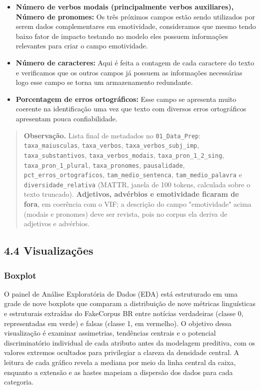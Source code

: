 \documentclass[
  brazilian,
  11pt,
]{article}
\begin{document}
\begin{itemize}
\item
  \textbf{Número de verbos modais (principalmente verbos auxiliares), Número de pronomes:} Os três próximos campos estão sendo utilizados por serem dados complementares em emotividade, consideramos que mesmo tendo baixo fator de impacto testando no modelo eles possuem informações relevantes para criar o campo emotividade.
\item
  \textbf{Número de caracteres:} Aqui é feita a contagem de cada caractere do texto e verificamos que os outros campos já possuem as informações necessárias logo esse campo se torna um armazenamento redundante.
\item
  \textbf{Porcentagem de erros ortográficos:} Esse campo se apresenta muito coerente na identificação uma vez que texto com diversos erros ortográficos apresentam pouca confiabilidade.
\end{itemize}

\begin{quote}
\textbf{Observação.} Lista final de metadados no \texttt{01\_Data\_Prep}: \texttt{taxa\_maiusculas}, \texttt{taxa\_verbos}, \texttt{taxa\_verbos\_subj\_imp}, \texttt{taxa\_substantivos}, \texttt{taxa\_verbos\_modais}, \texttt{taxa\_pron\_1\_2\_sing}, \texttt{taxa\_pron\_1\_plural}, \texttt{taxa\_pronomes}, \texttt{pausalidade}, \texttt{pct\_erros\_ortograficos}, \texttt{tam\_medio\_sentenca}, \texttt{tam\_medio\_palavra} e \texttt{diversidade\_relativa} (MATTR, janela de 100 tokens, calculada sobre o texto truncado). \textbf{Adjetivos, advérbios e emotividade ficaram de fora}, em coerência com o VIF; a descrição do campo "emotividade" acima (modais e pronomes) deve ser revista, pois no corpus ela deriva de adjetivos e advérbios.
\end{quote}

\subsection{4.4 Visualizações}\label{visualizauxe7uxf5es}

\subsubsection{Boxplot}\label{boxplot}

O painel de Análise Exploratória de Dados (EDA) está estruturado em uma grade de nove boxplots que comparam a distribuição de nove métricas linguísticas e estruturais extraídas do FakeCorpus BR entre notícias verdadeiras (classe 0, representadas em verde) e falsas (classe 1, em vermelho). O objetivo dessa visualização é examinar assimetrias, tendências centrais e o potencial discriminatório individual de cada atributo antes da modelagem preditiva, com os valores extremos ocultados para privilegiar a clareza da densidade central. A leitura de cada gráfico revela a mediana por meio da linha central da caixa, enquanto a extensão e as hastes mapeiam a dispersão dos dados para cada categoria.
\end{document}
